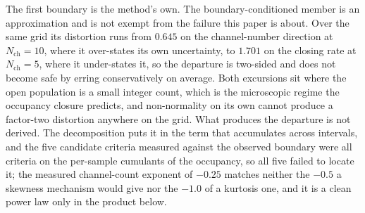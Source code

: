 The first boundary is the method's own. The boundary-conditioned member is an approximation and is not exempt from the failure this paper is about. Over the same grid its distortion runs from $0.645$ on the channel-number direction at $N_{\mathrm{ch}}=10$, where it over-states its own uncertainty, to $1.701$ on the closing rate at $N_{\mathrm{ch}}=5$, where it under-states it, so the departure is two-sided and does not become safe by erring conservatively on average. %
Both excursions sit where the open population is a small integer count, which is the microscopic regime the occupancy closure predicts, and non-normality on its own cannot produce a factor-two distortion anywhere on the grid. What produces the departure is not derived. The decomposition puts it in the term that accumulates across intervals, and the five candidate criteria measured against the observed boundary were all criteria on the per-sample cumulants of the occupancy, so all five failed to locate it; the measured channel-count exponent of $-0.25$ matches neither the $-0.5$ a skewness mechanism would give nor the $-1.0$ of a kurtosis one, and it is a clean power law only in the product below. %
